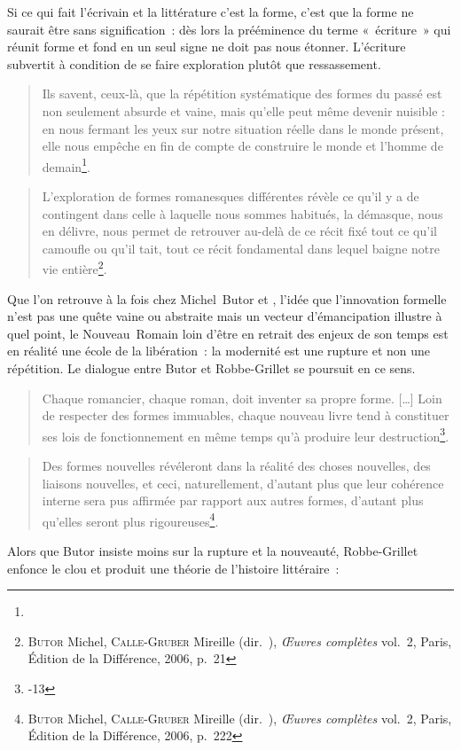 Si ce qui fait l'écrivain et la littérature c'est la forme, c'est que la forme ne saurait être sans signification~: dès lors la prééminence du terme «~écriture~» qui réunit forme et fond en un seul signe ne doit pas nous étonner. L'écriture subvertit à condition de se faire exploration plutôt que ressassement. 
\begin{quote}
    Ils savent, ceux-là, que la répétition systématique des formes du passé est non seulement absurde et vaine, mais qu’elle peut même devenir nuisible : en nous fermant les yeux sur notre situation réelle dans le monde présent, elle nous empêche en fin de compte de construire le monde et l’homme de demain\footnote{}.
\end{quote}
\begin{quote}
	L’exploration de formes romanesques différentes révèle ce qu’il y a de contingent dans celle à laquelle nous sommes habitués, la démasque, nous en délivre, nous permet de retrouver au-delà de ce récit fixé tout ce qu’il camoufle ou qu’il tait, tout ce récit fondamental dans lequel baigne notre vie entière\footnote{\textsc{Butor} Michel, \textsc{Calle-Gruber} Mireille (dir.~), \textit{Œuvres complètes} vol.~2, Paris, Édition de la Différence, 2006, p.~21}.
\end{quote}
Que l'on retrouve à la fois chez Michel~Butor et \robbe, l'idée que l'innovation formelle n'est pas une quête vaine ou abstraite mais un vecteur d'émancipation illustre à quel point, le Nouveau~Romain loin d'être en retrait des enjeux de son temps est en réalité une école de la libération~: la modernité est une rupture et non une répétition. Le dialogue entre Butor et Robbe-Grillet se poursuit en ce sens.
\begin{quote}
    Chaque romancier, chaque roman, doit inventer sa propre forme. […] Loin de respecter des formes immuables, chaque nouveau livre tend à constituer ses lois de fonctionnement en même temps qu'à produire leur destruction\footnote{-13}.
\end{quote}
\begin{quote}
    Des formes nouvelles révéleront dans la réalité des choses nouvelles, des liaisons nouvelles, et ceci, naturellement, d’autant plus que leur cohérence interne sera pus affirmée par rapport aux autres formes, d’autant plus qu’elles seront plus rigoureuses\footnote{\textsc{Butor} Michel, \textsc{Calle-Gruber} Mireille (dir.~), \textit{Œuvres complètes} vol.~2, Paris, Édition de la Différence, 2006, p.~222}.         
\end{quote}
Alors que Butor insiste moins sur la rupture et la nouveauté, Robbe-Grillet enfonce le clou et produit une théorie de l'histoire littéraire~:
